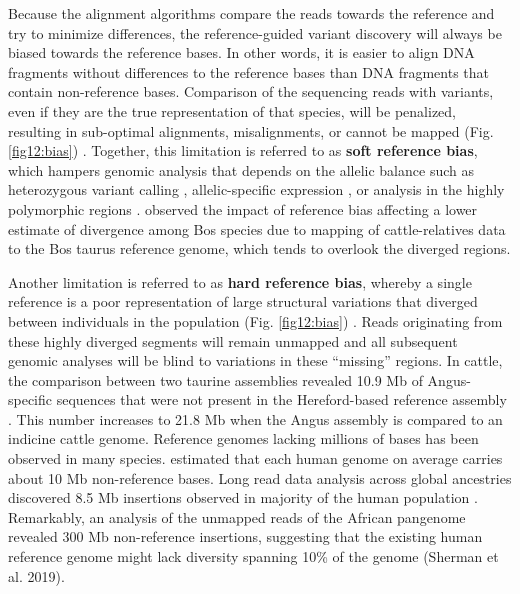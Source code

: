 \documentclass[../main.tex]{subfiles}
\begin{document}
Because the alignment algorithms compare the reads towards the reference and try to minimize differences, the reference-guided variant discovery will always be biased towards the reference bases. In other words, it is easier to align DNA fragments without differences to the reference bases than DNA fragments  that contain non-reference bases. Comparison of the sequencing reads with variants, even if they are the true representation of that species, will be penalized, resulting in sub-optimal alignments, misalignments, or cannot be mapped (Fig. \ref{fig12:bias}) \citep{pritt2018forge}. Together, this limitation is referred to as \textbf{soft reference bias}, which hampers genomic analysis that depends on the allelic balance such as heterozygous variant calling \citep{garrison2018variation}, allelic-specific expression \citep{salavati2019elimination}, or analysis in the highly polymorphic regions \citep{dilthey2015improved}. \citet{wu2018pervasive} observed the impact of reference bias affecting a lower estimate of divergence among Bos species due to mapping of cattle-relatives data to the Bos taurus reference genome, which tends to overlook the diverged regions. 

Another limitation is referred to as \textbf{hard reference bias}, whereby a single reference is a poor representation of large structural variations that diverged between individuals in the population (Fig. \ref{fig12:bias}) \citep{colquhoun2020nucleotide}. Reads originating from these highly diverged segments will remain unmapped and all subsequent genomic analyses will be blind to variations in these “missing” regions. In cattle, the comparison between two taurine assemblies revealed 10.9 Mb of Angus-specific sequences that were not present in the Hereford-based reference assembly \citep{low2019haplotype}. This number increases to 21.8 Mb when the Angus assembly is compared to an indicine cattle genome. Reference genomes lacking millions of bases has been observed in many species. \citet{ameur2018novo,audano2019characterizing} estimated that each human genome on average carries about 10 Mb non-reference bases. Long read data analysis across global ancestries discovered 8.5 Mb insertions observed in majority of the human population \citet{audano2019characterizing}. Remarkably, an analysis of the unmapped reads of the African pangenome revealed 300 Mb non-reference insertions, suggesting that the existing human reference genome might lack diversity spanning 10\% of the genome (Sherman et al. 2019). \\
\end{document}
